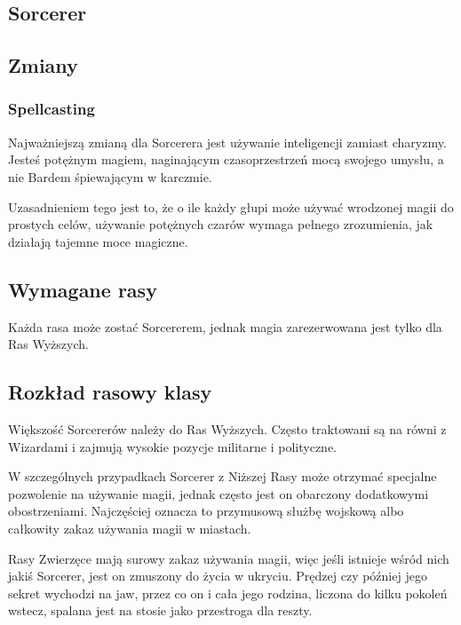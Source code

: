 \subsection{Sorcerer}
\subsection{Zmiany}
\subsubsection{Spellcasting}
Najważniejszą zmianą dla Sorcerera jest używanie inteligencji zamiast  charyzmy.
Jesteś potężnym magiem, naginającym czasoprzestrzeń mocą swojego umysłu, a nie
Bardem śpiewającym w karczmie.

Uzasadnieniem tego jest to, że o ile każdy głupi może używać wrodzonej magii  do
prostych celów,  używanie  potężnych  czarów  wymaga  pełnego  zrozumienia,  jak
działają tajemne moce magiczne.

\subsection{Wymagane rasy}
Każda rasa może zostać Sorcererem, jednak magia zarezerwowana jest tylko dla Ras
Wyższych.

\subsection{Rozkład rasowy klasy}
Większość Sorcererów należy do Ras Wyższych.  Często traktowani są	na	równi  z
Wizardami	 i	  zajmują	 wysokie	pozycje    militarne	i	 polityczne.

W	szczególnych   przypadkach	 Sorcerer	z	Niższej   Rasy	 może	otrzymać
specjalne  pozwolenie  na  używanie  magii,  jednak  często  jest  on  obarczony
dodatkowymi obostrzeniami.	Najczęściej oznacza to	przymusową	służbę	wojskową
albo całkowity zakaz używania magii w miastach.

Rasy Zwierzęce mają surowy zakaz używania magii, więc jeśli istnieje wśród	nich
jakiś Sorcerer, jest on zmuszony do życia w ukryciu.  Prędzej czy  później	jego
sekret wychodzi na jaw, przez co on  i	cała  jego	rodzina,  liczona  do  kilku
pokoleń  wstecz,  spalana  jest  na   stosie   jako   przestroga   dla	 reszty.

